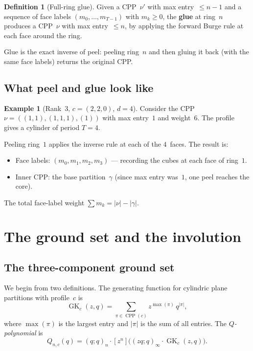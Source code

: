 \documentclass[11pt]{article}
\newcommand{\GK}{\operatorname{GK}}
\newcommand{\CPP}{\operatorname{CPP}}
\newcommand{\qpoch}[2]{(#1;#2)_\infty}
\newcommand{\qpochn}[3]{(#1;#2)_{#3}}
\theoremstyle{plain}
\theoremstyle{definition}
\newtheorem{definition}[theorem]{Definition}
\newtheorem{example}[theorem]{Example}
\begin{document}
\begin{definition}[Full-ring glue]
\label{def:glue}
Given a CPP~$\nu'$ with max entry~$\leq n-1$ and a sequence of face
labels $(m_0, \ldots, m_{T-1})$ with $m_k \geq 0$, the \textbf{glue}
at ring~$n$ produces a CPP~$\nu$ with max entry~$\leq n$, by applying
the forward Burge rule at each face around the ring.
\end{definition}

Glue is the exact inverse of peel: peeling ring~$n$ and then gluing
it back (with the same face labels) returns the original CPP.


\subsection{What peel and glue look like}

\begin{example}[Rank~$3$, $c = (2,2,0)$, $d = 4$]
\label{ex:peel-d4}
Consider the CPP $\nu = ((1,1), (1,1,1), (1))$ with max entry~$1$
and weight~$6$.  The profile gives a cylinder of period $T = 4$.

Peeling ring~$1$ applies the inverse rule at each of the $4$~faces.
The result is:
\begin{itemize}
  \item Face labels: $(m_0, m_1, m_2, m_3)$ --- recording the cubes
    at each face of ring~$1$.
  \item Inner CPP: the base partition~$\gamma$ (since max entry
    was~$1$, one peel reaches the core).
\end{itemize}
The total face-label weight $\sum m_k = |\nu| - |\gamma|$.
\end{example}


\section{The ground set and the involution}
\label{sec:ground-set}

\subsection{The three-component ground set}

We begin from two definitions.  The generating function for
cylindric plane partitions with profile~$c$ is
\begin{equation}\label{eq:GK}
  \GK_c(z,q) = \sum_{\pi \in \CPP(c)}
    z^{\max(\pi)}\, q^{|\pi|},
\end{equation}
where $\max(\pi)$ is the largest entry and $|\pi|$ is the
sum of all entries.  The \emph{$Q$-polynomial} is
\begin{equation}\label{eq:Q-def}
  Q_{n,c}(q)
  = \qpochn{q}{q}{n}
    \cdot [z^n]\bigl(\qpoch{zq}{q} \cdot \GK_c(z,q)\bigr).
\end{equation}
\end{document}

